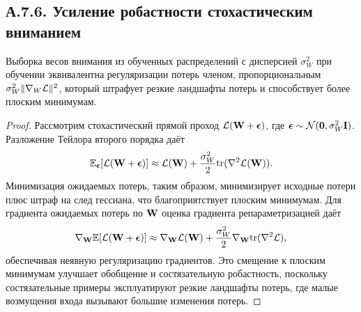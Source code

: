 \subsection*{А.7.6. Усиление робастности стохастическим вниманием}
\label{app:stoch_attention}

\begin{proposition}
Выборка весов внимания из обученных распределений с дисперсией $\sigma_W^2$ при обучении эквивалентна регуляризации потерь членом, пропорциональным $\sigma_W^2\|\nabla_W\mathcal{L}\|^2$, который штрафует резкие ландшафты потерь и способствует более плоским минимумам.
\end{proposition}

\begin{proof}
Рассмотрим стохастический прямой проход $\mathcal{L}(\mathbf{W}+\bm{\epsilon})$, где $\bm{\epsilon}\sim\mathcal{N}(\mathbf{0},\sigma_W^2\mathbf{I})$. Разложение Тейлора второго порядка даёт
\begin{equation}
\mathbb{E}_{\bm{\epsilon}}[\mathcal{L}(\mathbf{W}+\bm{\epsilon})]
\approx \mathcal{L}(\mathbf{W}) + \frac{\sigma_W^2}{2}\mathrm{tr}(\nabla^2\mathcal{L}(\mathbf{W})).
\end{equation}
Минимизация ожидаемых потерь, таким образом, минимизирует исходные потери плюс штраф на след гессиана, что благоприятствует плоским минимумам. Для градиента ожидаемых потерь по $\mathbf{W}$ оценка градиента репараметризацией даёт
\begin{equation}
\nabla_{\mathbf{W}}\mathbb{E}[\mathcal{L}(\mathbf{W}+\bm{\epsilon})] \approx \nabla_{\mathbf{W}}\mathcal{L}(\mathbf{W}) + \frac{\sigma_W^2}{2}\nabla_{\mathbf{W}}\mathrm{tr}(\nabla^2\mathcal{L}),
\end{equation}
обеспечивая неявную регуляризацию градиентов. Это смещение к плоским минимумам улучшает обобщение и состязательную робастность, поскольку состязательные примеры эксплуатируют резкие ландшафты потерь, где малые возмущения входа вызывают большие изменения потерь.
\end{proof}

